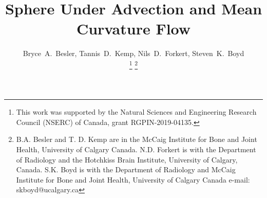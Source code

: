 \documentclass[journal]{IEEEtran}
\begin{document}
%
\title{Sphere Under Advection and Mean Curvature Flow}
%
%
%


\author{
  Bryce~A.~Besler,
  Tannis~D.~Kemp,
  Nils~D.~Forkert,
  Steven~K.~Boyd

\thanks{This work was supported by the Natural Sciences and Engineering Research Council (NSERC) of Canada, grant RGPIN-2019-04135.}
\thanks{B.A. Besler and T. D. Kemp are in the McCaig Institute for Bone and Joint Health, University of Calgary Canada. N.D. Forkert is with the Department of Radiology and the Hotchkiss Brain Institute, University of Calgary, Canada. S.K. Boyd is with the Department of Radiology and McCaig Institute for Bone and Joint Health, University of Calgary Canada e-mail: skboyd@ucalgary.ca}%
}
\end{document}
